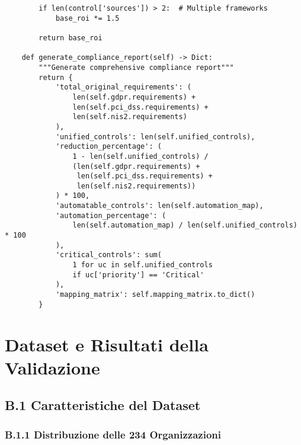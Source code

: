 \begin{verbatim}
        if len(control['sources']) > 2:  # Multiple frameworks
            base_roi *= 1.5
        
        return base_roi
    
    def generate_compliance_report(self) -> Dict:
        """Generate comprehensive compliance report"""
        return {
            'total_original_requirements': (
                len(self.gdpr.requirements) + 
                len(self.pci_dss.requirements) + 
                len(self.nis2.requirements)
            ),
            'unified_controls': len(self.unified_controls),
            'reduction_percentage': (
                1 - len(self.unified_controls) / 
                (len(self.gdpr.requirements) + 
                 len(self.pci_dss.requirements) + 
                 len(self.nis2.requirements))
            ) * 100,
            'automatable_controls': len(self.automation_map),
            'automation_percentage': (
                len(self.automation_map) / len(self.unified_controls) * 100
            ),
            'critical_controls': sum(
                1 for uc in self.unified_controls 
                if uc['priority'] == 'Critical'
            ),
            'mapping_matrix': self.mapping_matrix.to_dict()
        }
\end{verbatim}


\chapter{Dataset e Risultati della Validazione}
\label{app:dataset}

\section{B.1 Caratteristiche del Dataset}

\subsection{B.1.1 Distribuzione delle 234 Organizzazioni}

